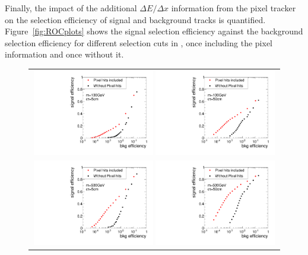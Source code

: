Finally, the impact of the additional $\Delta E/\Delta x$ information from the pixel tracker on the selection efficiency of signal and background tracks is quantified.
Figure~\ref{fig:ROCplots} shows the signal selection efficiency against the background selection efficiency for different selection cuts in \ias, once including the pixel information and once without it.
\begin{figure}[!b]
  \centering 
  \begin{tabular}{c}
    \includegraphics[width=0.49\textwidth]{figures/analysis/rocplot_wjets_mass_100GeV_ctau_5cm.pdf} 
    \includegraphics[width=0.49\textwidth]{figures/analysis/rocplot_wjets_mass_100GeV_ctau_50cm.pdf} \\
    \includegraphics[width=0.49\textwidth]{figures/analysis/rocplot_wjets_mass_500GeV_ctau_5cm.pdf} 
    \includegraphics[width=0.49\textwidth]{figures/analysis/rocplot_wjets_mass_500GeV_ctau_50cm.pdf}

\end{tabular}
\end{figure}
